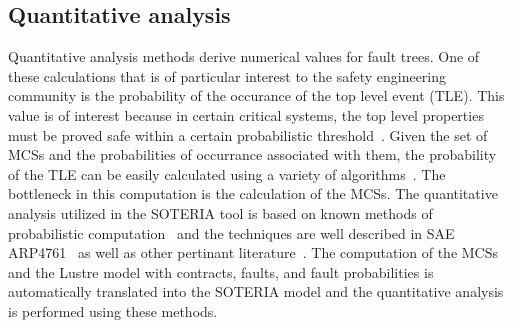 \subsection{Quantitative analysis}
Quantitative analysis methods derive numerical values for fault trees. One of these calculations that is of particular interest to the safety engineering community is the probability of the occurance of the top level event (TLE). This value is of interest because in certain critical systems, the top level properties must be proved safe within a certain probabilistic threshold~\cite{SAE:ARP4761}. Given the set of MCSs and the probabilities of occurrance associated with them, the probability of the TLE can be easily calculated using a variety of algorithms~\cite{RuijtersSurvey}. The bottleneck in this computation is the calculation of the MCSs. The quantitative analysis utilized in the SOTERIA tool is based on known methods of probabilistic computation~\cite{SOTERIAproject} and the techniques are well described in SAE ARP4761~\cite{SAE:ARP4761} as well as other pertinant literature~\cite{RuijtersSurvey}. The computation of the MCSs and the Lustre model with contracts, faults, and fault probabilities is automatically translated into the SOTERIA model and the quantitative analysis is performed using these methods. 






